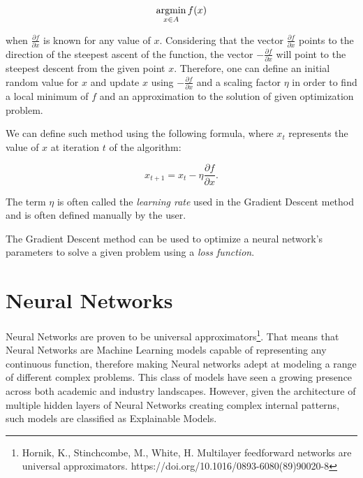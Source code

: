 \begin{equation}
    \operatorname*{argmin}_{x \in A} f(x)
    \label{eq:min_func}
\end{equation}

when \(\frac{\partial f}{\partial x}\) is known for any value of \(x\). Considering that the vector \(\frac{\partial f}{\partial x}\) points to the direction of the steepest ascent of the function, the vector \(- \frac{\partial f}{\partial x}\) will point to the steepest descent from the given point \(x\).
Therefore, one can define an initial random value for \(x\) and update \(x\) using \(- \frac{\partial f}{\partial x}\) and a scaling factor \(\eta\) in order to find a local minimum of \(f\) and an approximation to the solution of given optimization problem.

We can define such method using the following formula, where \(x_t\) represents the value of \(x\) at iteration \(t\) of the algorithm:

\begin{equation}
    x_{t + 1} = x_t - \eta \frac{\partial f}{\partial x}.
    \label{eq:gradient_descent}  
\end{equation}

The term \(\eta\) is often called the \emph{learning rate} used in the Gradient Descent method and is often defined manually by the user.

The Gradient Descent method can be used to optimize a neural network's parameters to solve a given problem using a \emph{loss function}. 

\section{Neural Networks}

Neural Networks are proven to be universal approximators\footnote{Hornik, K., Stinchcombe, M., White, H. Multilayer feedforward networks are universal approximators. https://doi.org/10.1016/0893-6080(89)90020-8}. That means that Neural Networks are Machine Learning models capable of representing any continuous function,
therefore making Neural networks adept at modeling a range of different complex problems.
This class of models have seen a growing presence across both academic and industry landscapes. However, given the architecture of multiple hidden layers of Neural Networks creating complex internal patterns, such models are classified as Explainable Models. 

